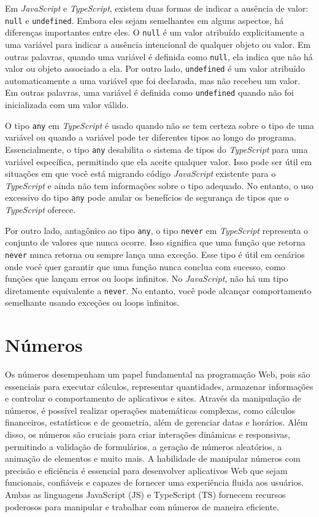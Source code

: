 Em \textit{JavaScript} e \textit{TypeScript}, existem duas formas de indicar a ausência de valor: \texttt{null} e \texttt{undefined}. Embora eles sejam semelhantes em alguns aspectos, há diferenças importantes entre eles. O \texttt{null} é um valor atribuído explicitamente a uma variável para indicar a ausência intencional de qualquer objeto ou valor. Em outras palavras, quando uma variável é definida como \texttt{null}, ela indica que não há valor ou objeto associado a ela. Por outro lado, \texttt{undefined} é um valor atribuído automaticamente a uma variável que foi declarada, mas não recebeu um valor. Em outras palavras, uma variável é definida como \texttt{undefined} quando não foi inicializada com um valor válido.

O tipo \texttt{any} em \textit{TypeScript} é usado quando não se tem certeza sobre o tipo de uma variável ou quando a variável pode ter diferentes tipos ao longo do programa. Essencialmente, o tipo \texttt{any} desabilita o sistema de tipos do \textit{TypeScript} para uma variável específica, permitindo que ela aceite qualquer valor. Isso pode ser útil em situações em que você está migrando código \textit{JavaScript} existente para o \textit{TypeScript} e ainda não tem informações sobre o tipo adequado. No entanto, o uso excessivo do tipo \texttt{any} pode anular os benefícios de segurança de tipos que o \textit{TypeScript} oferece.

Por outro lado, antagônico ao tipo \texttt{any}, o tipo \texttt{never} em \textit{TypeScript} representa o conjunto de valores que nunca ocorre. Isso significa que uma função que retorna \texttt{never} nunca retorna ou sempre lança uma exceção. Esse tipo é útil em cenários onde você quer garantir que uma função nunca conclua com sucesso, como funções que lançam erros ou loops infinitos. No \textit{JavaScript}, não há um tipo diretamente equivalente a \texttt{never}. No entanto, você pode alcançar comportamento semelhante usando exceções ou loops infinitos.

\section{Números}
\label{JS_numeros}

Os números desempenham um papel fundamental na programação Web, pois são essenciais para executar cálculos, representar quantidades, armazenar informações e controlar o comportamento de aplicativos e sites. Através da manipulação de números, é possível realizar operações matemáticas complexas, como cálculos financeiros, estatísticos e de geometria, além de gerenciar datas e horários. Além disso, os números são cruciais para criar interações dinâmicas e responsivas, permitindo a validação de formulários, a geração de números aleatórios, a animação de elementos e muito mais. A habilidade de manipular números com precisão e eficiência é essencial para desenvolver aplicativos Web que sejam funcionais, confiáveis e capazes de fornecer uma experiência fluida aos usuários. Ambas as linguagens JavaScript (JS) e TypeScript (TS) fornecem recursos poderosos para manipular e trabalhar com números de maneira eficiente.

